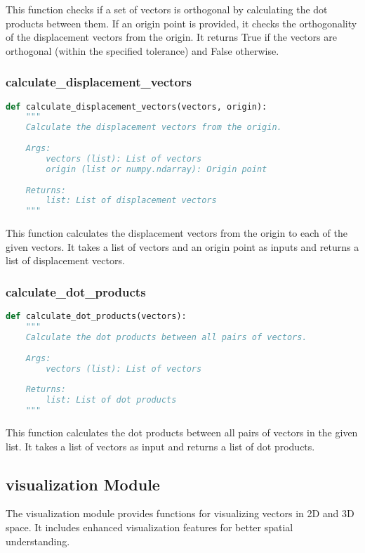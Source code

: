 This function checks if a set of vectors is orthogonal by calculating the dot products between them. If an origin point is provided, it checks the orthogonality of the displacement vectors from the origin. It returns True if the vectors are orthogonal (within the specified tolerance) and False otherwise.

\subsubsection{calculate\_displacement\_vectors}

\begin{lstlisting}[language=Python]
def calculate_displacement_vectors(vectors, origin):
    """
    Calculate the displacement vectors from the origin.
    
    Args:
        vectors (list): List of vectors
        origin (list or numpy.ndarray): Origin point
        
    Returns:
        list: List of displacement vectors
    """
\end{lstlisting}

This function calculates the displacement vectors from the origin to each of the given vectors. It takes a list of vectors and an origin point as inputs and returns a list of displacement vectors.

\subsubsection{calculate\_dot\_products}

\begin{lstlisting}[language=Python]
def calculate_dot_products(vectors):
    """
    Calculate the dot products between all pairs of vectors.
    
    Args:
        vectors (list): List of vectors
        
    Returns:
        list: List of dot products
    """
\end{lstlisting}

This function calculates the dot products between all pairs of vectors in the given list. It takes a list of vectors as input and returns a list of dot products.

\subsection{visualization Module}

The visualization module provides functions for visualizing vectors in 2D and 3D space. It includes enhanced visualization features for better spatial understanding.

